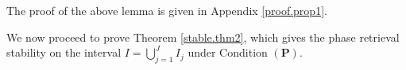 \documentclass[11pt, reqno]{amsart}
\newtheorem{lemma}[theorem]{Lemma}%
\newcommand{\R}{\mathbb{R}}
\numberwithin{equation}{section}
\begin{document}
The proof of the above lemma is given in Appendix \ref{proof.prop1}.






\smallskip

We now proceed to prove Theorem \ref{stable.thm2}, which gives the phase retrieval stability on the interval $I=\bigcup_{j=1}^J I_j $ under Condition $(\mathbf P)$.

\smallskip
\end{document}
